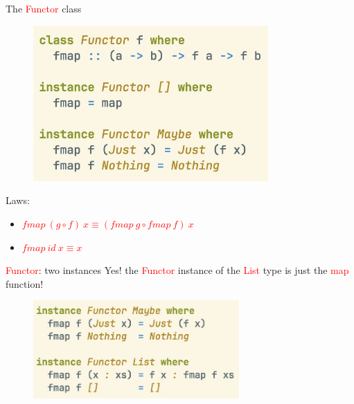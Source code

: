 \documentclass[pdf]{beamer}
\newcommand{\code}[1]{\textcolor{Red}{\textsf{#1}}}
\begin{document}
\begin{frame}{The \code{Functor} class}
  \begin{figure}[H]
    \centering
    \includegraphics[width=0.80\textwidth]{functor-class}
  \end{figure}
  Laws:
  \begin{itemize}
  \item \code{$fmap \: (g \circ f) \: x \equiv (fmap \: g \circ fmap \: f) \: x$}
  \item \code{$fmap \: id \: x \equiv x$}
  \end{itemize}
\end{frame}

\begin{frame}{\code{Functor}: two instances}
  Yes! the \code{Functor} instance of the \code{List} type is just the \code{map} function!

  \begin{figure}[H]
    \centering
    \includegraphics[width=0.70\textwidth]{functor-instances}
    \end{figure}
\end{frame}
\end{document}
